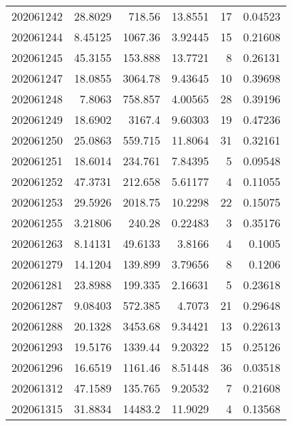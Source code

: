 \begin{tabular}{rrrrrr}
 202061242 &         28.8029  &      718.56   &           13.8551  &          17 & 0.04523 \\
 202061244 &          8.45125 &     1067.36   &            3.92445 &          15 & 0.21608 \\
 202061245 &         45.3155  &      153.888  &           13.7721  &           8 & 0.26131 \\
 202061247 &         18.0855  &     3064.78   &            9.43645 &          10 & 0.39698 \\
 202061248 &          7.8063  &      758.857  &            4.00565 &          28 & 0.39196 \\
 202061249 &         18.6902  &     3167.4    &            9.60303 &          19 & 0.47236 \\
 202061250 &         25.0863  &      559.715  &           11.8064  &          31 & 0.32161 \\
 202061251 &         18.6014  &      234.761  &            7.84395 &           5 & 0.09548 \\
 202061252 &         47.3731  &      212.658  &            5.61177 &           4 & 0.11055 \\
 202061253 &         29.5926  &     2018.75   &           10.2298  &          22 & 0.15075 \\
 202061255 &          3.21806 &      240.28   &            0.22483 &           3 & 0.35176 \\
 202061263 &          8.14131 &       49.6133 &            3.8166  &           4 & 0.1005  \\
 202061279 &         14.1204  &      139.899  &            3.79656 &           8 & 0.1206  \\
 202061281 &         23.8988  &      199.335  &            2.16631 &           5 & 0.23618 \\
 202061287 &          9.08403 &      572.385  &            4.7073  &          21 & 0.29648 \\
 202061288 &         20.1328  &     3453.68   &            9.34421 &          13 & 0.22613 \\
 202061293 &         19.5176  &     1339.44   &            9.20322 &          15 & 0.25126 \\
 202061296 &         16.6519  &     1161.46   &            8.51448 &          36 & 0.03518 \\
 202061312 &         47.1589  &      135.765  &            9.20532 &           7 & 0.21608 \\
 202061315 &         31.8834  &    14483.2    &           11.9029  &           4 & 0.13568 \\

\end{tabular}
